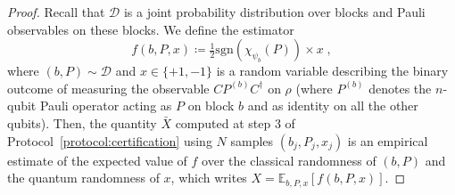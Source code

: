 \documentclass[a4paper,twocolumn,11pt,unpublished]{../../revision/quantumarticle}
\newcommand{\sgn}{\mathrm{sgn}}
\newcommand{\jdist}{\mathcal D} %
\begin{document}
        \begin{proof}
        Recall that $\jdist$ is a joint probability distribution over blocks and Pauli observables on these blocks. We define the estimator
        \begin{equation}
        \label{def_f}
            f(b,P,x)\coloneqq \tfrac 1 2 \sgn(\chi_{\psi_b}(P)) \times x\;,
        \end{equation}
            where $(b,P)\sim\mathcal D$ and $x\in\{+1, -1\}$ is a random variable describing the binary outcome of measuring the observable $C P^{(b)}C^\dagger$ on $\rho$ (where $P^{(b)}$ denotes the $n$-qubit Pauli operator acting as $P$ on block $b$ and as identity on all the other qubits). Then, the quantity $\bar X$ computed at step $3$ of Protocol~\ref{protocol:certification} using $N$ samples $(b_j,P_j,x_j)$ is an empirical estimate of the expected value of $f$ over the classical randomness of $(b,P)$ and the quantum randomness of $x$, which writes $X=\mathbb E_{b,P,x}[f(b,P,x)]$.


\end{proof}
\end{document}
